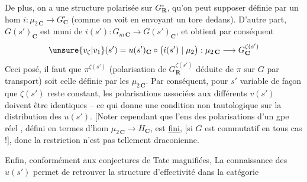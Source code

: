 De plus, on a une structure polarisée\inserted{ $\pi$} sur $G_{\mathbf R}^{\circ}$, qu'on peut  supposer définie par un hom  $i:\mu_{2\,\mathbf C}\longrightarrow G_{\mathbf C}^{\circ}$ (comme on voit en envoyant un tore  dedans). D'autre part, $G(s')_{\mathbf C}$ est muni de $i(s'):G_{m\,\mathbf C}\to G(s')_{\mathbf C}$, et  obtient par conséquent
\[
\unsure{v_{\zeta}|v_1}(s')=u(s')_{\mathbf C}\circ\bigl(i(s')\mid\mu_2\bigr):\mu_{2\,\mathbf C}\longrightarrow G_{\mathbf C}^{\zeta(s')}
\]
 Ceci posé, il faut que $\pi^{\zeta(s')}$ (polarisation de $G_{\mathbf R}^{\zeta(s')}$ déduite de $\pi$ sur $G$ par transport) soit celle définie par les $\mu_{2\,\mathbf C}$. Par conséquent, pour $s'$ variable de façon que $\zeta(s')$ reste constant, les polarisations  associées aux différents $v(s')$ doivent être identiques -- ce qui donne une condition non tautologique sur la distribution des  $u(s')$. [Noter cependant que l'ens des  polarisations d'un gpe réel , défini en termes d'hom $\mu_{2\,\mathbf C}\to H_{\mathbf C}$,  est \uline{fini}, [si $G$ est commutatif en tous cas !], donc la restriction n'est pas tellement draconienne.

Enfin, conformément aux conjectures de Tate magnifiées, La connaissance des $u(s')$ permet de retrouver la structure d'effectivité dans la catégorie
